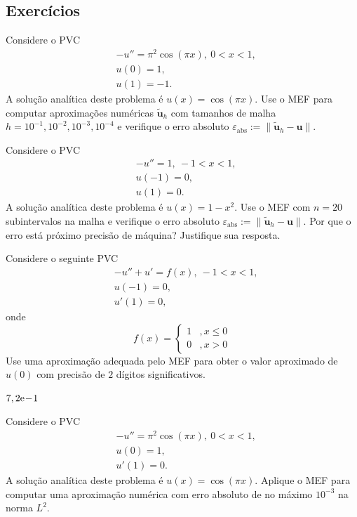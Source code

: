 \subsection{Exercícios}

\begin{exer}
  Considere o PVC
  \begin{align}
    &-u'' = \pi^2\cos(\pi x), ~0 < x < 1,\\
    &u(0) = 1,\\
    &u(1) = -1.
  \end{align}
  A solução analítica deste problema é $u(x) = \cos(\pi x)$. Use o MEF para computar aproximações numéricas $\tilde{\pmb{u}}_h$ com tamanhos de malha $h=10^{-1}, 10^{-2}, 10^{-3}, 10^{-4}$ e verifique o erro absoluto $\varepsilon_{\text{abs}} := \|\tilde{\pmb{u}}_h - \pmb{u}\|$.
\end{exer}

\begin{exer}
  Considere o PVC
  \begin{align}
    &-u'' = 1, ~-1 < x < 1,\\
    &u(-1) = 0,\\
    &u(1) = 0.
  \end{align}
  A solução analítica deste problema é $u(x) = 1-x^2$. Use o MEF com $n=20$ subintervalos na malha e verifique o erro absoluto $\varepsilon_{\text{abs}} := \|\tilde{\pmb{u}}_h - \pmb{u}\|$. Por que o erro está próximo precisão de máquina? Justifique sua resposta.
\end{exer}

\begin{exer}
Considere o seguinte PVC
\begin{subequations}
  \begin{align}
    &-u'' + u' = f(x), ~-1 < x < 1,\\
    &u(-1) = 0,\\
    &u'(1) =0,
  \end{align}
\end{subequations}
onde
\begin{equation}
  f(x) = \left\{
    \begin{array}{ll}
      1 &, x\leq 0\\
      0 &, x>0
    \end{array}
  \right.
\end{equation}
Use uma aproximação adequada pelo MEF para obter o valor aproximado de $u(0)$ com precisão de $2$ dígitos significativos.
\end{exer}
\begin{resp}
  $7,2\mathrm{e}\!-\!1$
\end{resp}

\begin{exer}
  Considere o PVC
  \begin{align}
    &-u'' = \pi^2\cos(\pi x), ~0 < x < 1,\\
    &u(0) = 1,\\
    &u'(1) = 0.
  \end{align}
  A solução analítica deste problema é $u(x) = \cos(\pi x)$. Aplique o MEF para computar uma aproximação numérica com erro absoluto de no máximo $10^{-3}$ na norma $L^2$.
\end{exer}
